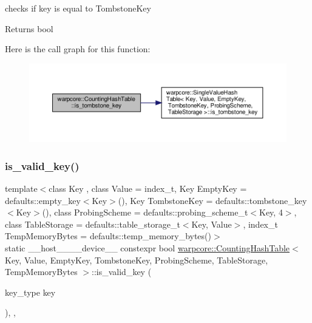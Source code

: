 checks if {\ttfamily key} is equal to {\ttfamily Tombstone\+Key} 

\begin{DoxyReturn}{Returns}
{\ttfamily bool} 
\end{DoxyReturn}
Here is the call graph for this function\+:
\nopagebreak
\begin{figure}[H]
\begin{center}
\leavevmode
\includegraphics[width=350pt]{classwarpcore_1_1CountingHashTable_a0476fd077b63d32e3ebb5bb022bdd789_cgraph}
\end{center}
\end{figure}
\mbox{\label{classwarpcore_1_1CountingHashTable_ab186fb0eadd3f5d1cd5bc290489ab0df}} 
\subsubsection{\texorpdfstring{is\+\_\+valid\+\_\+key()}{is\_valid\_key()}}
{\footnotesize\ttfamily template$<$class Key , class Value  = index\+\_\+t, Key Empty\+Key = defaults\+::empty\+\_\+key$<$\+Key$>$(), Key Tombstone\+Key = defaults\+::tombstone\+\_\+key$<$\+Key$>$(), class Probing\+Scheme  = defaults\+::probing\+\_\+scheme\+\_\+t$<$\+Key, 4$>$, class Table\+Storage  = defaults\+::table\+\_\+storage\+\_\+t$<$\+Key, Value$>$, index\+\_\+t Temp\+Memory\+Bytes = defaults\+::temp\+\_\+memory\+\_\+bytes()$>$ \\
static \+\_\+\+\_\+host\+\_\+\+\_\+\+\_\+\+\_\+device\+\_\+\+\_\+ constexpr bool \hyperlink{classwarpcore_1_1CountingHashTable}{warpcore\+::\+Counting\+Hash\+Table}$<$ Key, Value, Empty\+Key, Tombstone\+Key, Probing\+Scheme, Table\+Storage, Temp\+Memory\+Bytes $>$\+::is\+\_\+valid\+\_\+key (\begin{DoxyParamCaption}\item[{key\+\_\+type}]{key }\end{DoxyParamCaption})\hspace{0.3cm}{\ttfamily [inline]}, {\ttfamily [static]}, {\ttfamily [noexcept]}}



